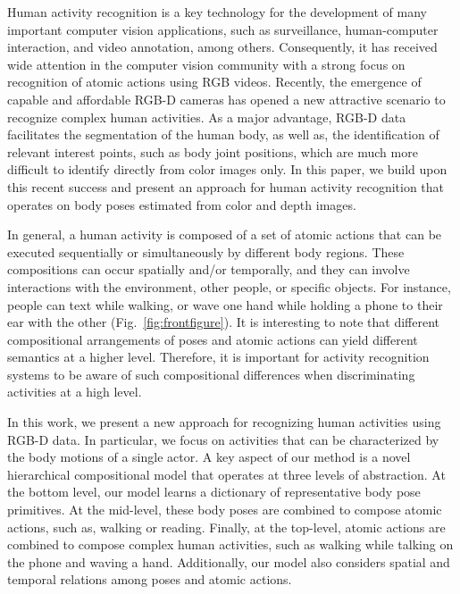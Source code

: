 Human activity recognition is a key technology for the development of many
important computer vision applications, such as
surveillance, human-computer interaction, and video annotation, among others.
Consequently, it has received wide attention in the computer vision community
\cite{Aggarwal2011,vishwakarma2013survey,weinland2011survey}
with a strong focus on recognition of atomic actions using RGB videos.
Recently, the emergence of capable and affordable RGB-D cameras
has opened a new attractive
scenario to recognize complex human activities. As a major
advantage, RGB-D data facilitates the
segmentation of the human body, as well as, the identification of relevant
interest points, such as body joint positions\cite{Shotton2011}, which are much more
difficult to identify directly from color images only.
In this paper, we build upon this recent success and present an approach
for human activity recognition that operates on body poses estimated from
color and depth images.

In general, a human activity is composed of a set of atomic actions that can be
executed sequentially or simultaneously by different body regions.
These compositions can occur spatially and/or temporally, and they
can involve
interactions with the environment, other people, or specific objects.
For instance, people can text while walking, or wave one
hand while holding a phone to their ear with the other
(Fig.~\ref{fig:frontfigure}).
It is interesting to note that different
compositional arrangements of poses and atomic actions can yield different
semantics at a higher level.
Therefore, it is important for activity recognition systems
to be aware of such compositional differences when discriminating
activities at a high level.

In this work, we present a new approach for recognizing human activities using RGB-D data. In 
particular, we focus on activities that can be characterized by the body motions of a single actor. 
A key aspect of our method is a novel hierarchical compositional model that operates at three levels 
of abstraction. At the bottom level, our model learns a dictionary of representative body pose 
primitives. At the mid-level, these body poses are combined to compose atomic actions, such as, 
walking or reading. Finally, at the top-level, atomic actions are combined to compose complex human 
activities, such as walking while talking on the phone and waving a hand. Additionally, our model 
also considers spatial and temporal relations among poses and atomic actions.

